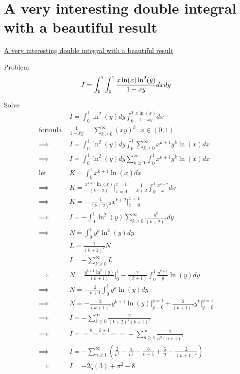 \documentclass {article}
\begin{document}
\section{A very interesting double integral with a beautiful result}
\href{https://www.youtube.com/watch?v=lWVBnWCz63I}{A very interesting double integral with a beautiful result}

Problem 
\[
  I = \int_0^{1}\int_0^{1} \frac{x \ln(x)\ln^{2}(y)} { 1 - xy} {d}x{dy} \\
\]


Solve
\[
\begin{matrix}
    &   I = \int_0^{1} \ln^{2}(y){d}y \int_0^{1} \frac{x \ln(x)}{1 - xy} {d}x\\
\text{formula  } & \frac{1}{1-xy} = \displaystyle\sum_{k \ge 0}^{\infty} (xy)^{k} \text{   }  x \in \left(0,1\right) \\
\implies & I = \int_0^{1} \ln^{2}(y){d}y \int_0^{1} \displaystyle\sum_{k \ge 0}^{\infty} x^{k+1}y^{k}\ln(x) {d}x \\
\implies & I = \int_0^{1} \ln^{2}(y){d}y \displaystyle\sum_{k \ge 0}^{\infty} \int_0^{1}  x^{k+1}y^{k}\ln(x) {d}x \\
\text{let  } & K =  \int_0^{1}  x^{k+1}\ln(x) {d}x \\
\implies & K = \frac{x^{k+2} \ln(x)}{(k+2)}\Big|_{x=0}^{x=1} - \frac{1}{k+2} \int_0^{1} \frac{x^{k+2}}{x} {d}x \\
\implies & K = - \frac{1}{(k+2)^2} x^{k+2} \Big|_{x=0}^{x=1} \\
\implies & I = - \int_0^{1} \ln^{2}(y)\displaystyle\sum_{k \ge 0}^{\infty} \frac{y^k}{(k+2)^2} {d}y \\
\implies & N = \int_0^1 y^k \ln^{2}(y){d}y \\
         & L = \frac{1}{(k+2)^2} N \\
         & I = - \displaystyle\sum_{k \ge 0}^{\infty} L \\
\implies & N = \frac{y^{k+1}\ln^2(y)}{(k+1)}\Big|_0^1 - \frac{2}{(k+1)}\int_0^1 \frac{y^{k+1}}{y}\ln(y){d}y  \\
\implies & N = - \frac{2}{k+1} \int_0^1 y^k \ln(y) {d}y \\
\implies & N = - \frac{2}{(k+1)^2} y^{k+1}\ln(y)\Big|_{y=0}^{y=1} + \frac{2}{(k+1)^3}y^{k}\Big|_{y=0}^{y=1} \\
\implies & I = - \displaystyle\sum_{k \ge 0}^{\infty} \frac{2}{(k+2)^2 (k+1)^3} \\
\implies & I \stackrel{n = k+1} {======} -\displaystyle\sum_{n \ge 1}^{\infty} \frac{2}{n^3 (n+1)^2} \\
\implies & I = - \displaystyle\sum_{n \ge 1}^{\infty}\left( \frac{2}{n^3} - \frac{4}{n^2} - \frac{6}{n+1} + \frac{6}{n} - \frac{2}{(n+1)^2} \right) \\
\implies & I = - 2 \zeta(3) + {\pi}^2 - 8 \\
\
\end{matrix}
\]
\end{document}
